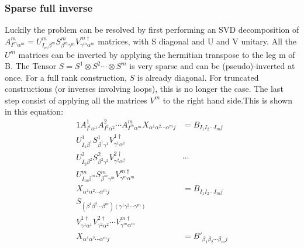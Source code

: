 \subsubsection{Sparse full inverse}

Luckily the problem can be resolved by first performing an SVD decomposition of $A^m_{ I^m \alpha^m } = U^m_{ I_m \beta^m } S^m_{\beta^m \gamma^m}  V^{m\dagger}_{\gamma^m \alpha^m}$ matrices, with S diagonal and U and V unitary. All the $U^m$ matrices can be inverted by applying the hermitian transpose to the leg m of B. The Tensor $S = S^1 \otimes S^2 \cdots \otimes S^m$ is very sparse and can be (pseudo)-inverted at once. For a full rank construction, $S$  is already diagonal. For truncated constructions (or inverses involving loops), this is no longer the case.
The last step consist of applying all the matrices $V^m$ to the right hand side.This is shown in this equation:
\begin{alignat}{1}
    A^1_{ I^1 \alpha^1 }   A^2_{ I^2 \alpha^2 }  \cdots  A^m_{ I^m \alpha^m }   X_{ \alpha^1  \alpha^2  \cdots \alpha^m j } & =  B_{  I_1  I_2 \cdots I_m   j }              \\%
    U^1_{ I_1 \beta^1 } S^1_{\beta^1 \gamma^1}  V^{1\dagger}_{\gamma^1 \alpha^1}                                            & \nonumber                                      \\
    U^2_{ I_2 \beta^2 } S^2_{\beta^2 \gamma^2}  V^{2\dagger}_{\gamma^2 \alpha^2}                                            & \cdots  \nonumber                              \\
    U^m_{ I_m \beta^m } S^m_{\beta^m \gamma^m}  V^{m\dagger}_{\gamma^m \alpha^m}                                            & \nonumber                                      \\
    X_{ \alpha^1  \alpha^2  \cdots \alpha^m j }                                                                             & =  B_{  I_1  I_2 \cdots I_m   j }              \\ %
    S_{ (\beta^1 \beta^2 \cdots \beta^m) (\gamma^1  \gamma^2 \cdots \gamma^m)  }                                            & \nonumber                                      \\
    V^{1\dagger}_{\gamma^1 \alpha^1}   V^{2\dagger}_{\gamma^2 \alpha^2}  \cdots  V^{m\dagger}_{\gamma^m \alpha^m}           & \nonumber                                      \\
    X_{ \alpha^1  \alpha^2  \cdots \alpha^m j }                                                                             & =  B'_{  \beta_1  \beta_2 \cdots \beta_m   j }
\end{alignat}


